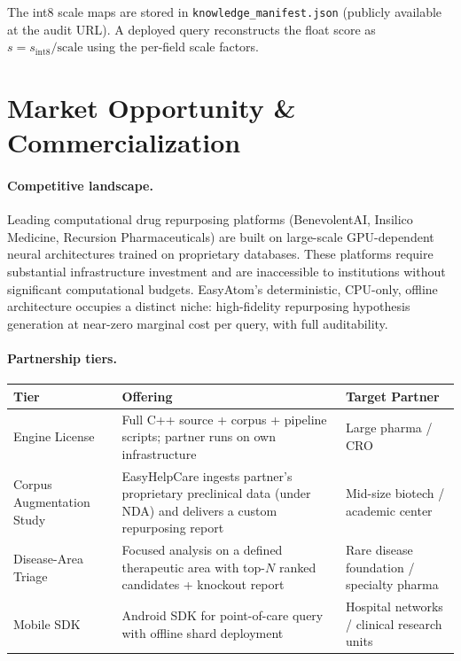 \documentclass[11pt]{article}
\begin{document}
The int8 scale maps are stored in \texttt{knowledge\_manifest.json}
(publicly available at the audit URL).
A deployed query reconstructs the float score as
$s = s_{\mathrm{int8}} / \mathrm{scale}$ using the per-field scale factors.

\section{Market Opportunity \& Commercialization}
\label{sec:market}

\paragraph{Competitive landscape.}
Leading computational drug repurposing platforms (BenevolentAI,
Insilico Medicine, Recursion Pharmaceuticals) are built on large-scale
GPU-dependent neural architectures trained on proprietary databases.
These platforms require substantial infrastructure investment and are
inaccessible to institutions without significant computational budgets.
EasyAtom's deterministic, CPU-only, offline architecture occupies a
distinct niche: high-fidelity repurposing hypothesis generation at
near-zero marginal cost per query, with full auditability.

\paragraph{Partnership tiers.}
\begin{center}
\small
\begin{tabular}{lp{5.4cm}l}
\toprule
\textbf{Tier} & \textbf{Offering} & \textbf{Target Partner} \\
\midrule
Engine License &
  Full C++ source + corpus + pipeline scripts;
  partner runs on own infrastructure &
  Large pharma / CRO \\[4pt]
Corpus Augmentation Study &
  EasyHelpCare ingests partner's proprietary preclinical data
  (under NDA) and delivers a custom repurposing report &
  Mid-size biotech / academic center \\[4pt]
Disease-Area Triage &
  Focused analysis on a defined therapeutic area with top-$N$
  ranked candidates + knockout report &
  Rare disease foundation / specialty pharma \\[4pt]
Mobile SDK &
  Android SDK for point-of-care query with offline shard deployment &
  Hospital networks / clinical research units \\
\bottomrule
\end{tabular}
\end{center}
\end{document}
